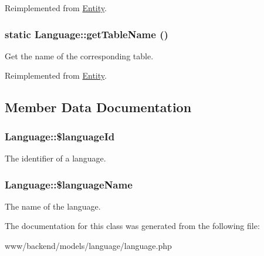 Reimplemented from \hyperlink{classEntity_a61bbfbb4058427174e002a09ddc77c41}{Entity}.

\hypertarget{classLanguage_a262653445a1324d6c02099e01cab0dff}{
\subsubsection[{getTableName}]{\setlength{\rightskip}{0pt plus 5cm}static Language::getTableName ()}}
\label{classLanguage_a262653445a1324d6c02099e01cab0dff}
Get the name of the corresponding table. 

Reimplemented from \hyperlink{classEntity_a8305fd94740ac62cbafb9de76567ce37}{Entity}.



\subsection{Member Data Documentation}
\hypertarget{classLanguage_a3074b0c6617cb91c7e31ccb3faf33908}{
\subsubsection[{\$languageId}]{\setlength{\rightskip}{0pt plus 5cm}Language::\$languageId}}
\label{classLanguage_a3074b0c6617cb91c7e31ccb3faf33908}
The identifier of a language. \hypertarget{classLanguage_a668d1ca7b67b40b4f8d001e2e1480dc3}{
\subsubsection[{\$languageName}]{\setlength{\rightskip}{0pt plus 5cm}Language::\$languageName}}
\label{classLanguage_a668d1ca7b67b40b4f8d001e2e1480dc3}
The name of the language. 

The documentation for this class was generated from the following file:\begin{DoxyCompactItemize}
\item 
www/backend/models/language/language.php\end{DoxyCompactItemize}
